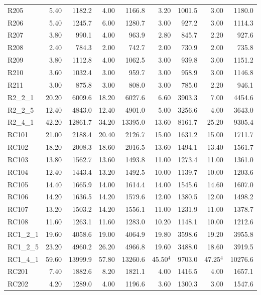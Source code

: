 \documentclass{article}
\begin{document}
{\begin{longtable}{l r r r r r r r r }
R205 & 5.40 & 1182.2 & 4.00 & 1166.8 & 3.20 & 1001.5 & 3.00 & 1180.0 \\
R206 & 5.40 & 1245.7 & 6.00 & 1280.7 & 3.00 & 927.2 & 3.00 & 1114.3 \\
R207 & 3.80 & 990.1 & 4.00 & 963.9 & 2.80 & 845.7 & 2.20 & 927.6 \\
R208 & 2.40 & 784.3 & 2.00 & 742.7 & 2.00 & 730.9 & 2.00 & 735.8 \\
R209 & 3.80 & 1112.8 & 4.00 & 1062.5 & 3.00 & 939.8 & 3.00 & 1151.2 \\
R210 & 3.60 & 1032.4 & 3.00 & 959.7 & 3.00 & 958.9 & 3.00 & 1146.8 \\
R211 & 3.00 & 875.8 & 3.00 & 808.0 & 3.00 & 785.0 & 2.20 & 946.1 \\
R2\_2\_1 & 20.20 & 6009.6 & 18.20 & 6027.6 & 6.60 & 3903.3 & 7.00 & 4454.6 \\
R2\_2\_5 & 12.40 & 4843.0 & 12.40 & 4901.0 & 5.00 & 3256.6 & 4.00 & 3643.0 \\
R2\_4\_1 & 42.20 & 12861.7 & 34.20 & 13395.0 & 13.60 & 8161.7 & 25.20 & 9305.4 \\
RC101 & 21.00 & 2188.4 & 20.40 & 2126.7 & 15.00 & 1631.2 & 15.00 & 1711.7 \\
RC102 & 18.20 & 2008.3 & 18.60 & 2016.5 & 13.60 & 1494.1 & 13.40 & 1561.7 \\
RC103 & 13.80 & 1562.7 & 13.60 & 1493.8 & 11.00 & 1273.4 & 11.00 & 1361.0 \\
RC104 & 12.40 & 1443.4 & 13.20 & 1492.5 & 10.00 & 1139.7 & 10.00 & 1203.6 \\
RC105 & 14.40 & 1665.9 & 14.00 & 1614.4 & 14.00 & 1545.6 & 14.60 & 1607.0 \\
RC106 & 14.20 & 1636.5 & 14.20 & 1579.6 & 12.00 & 1380.5 & 12.00 & 1498.2 \\
RC107 & 13.20 & 1503.2 & 14.20 & 1556.1 & 11.00 & 1231.9 & 11.00 & 1378.7 \\
RC108 & 11.60 & 1263.1 & 11.60 & 1283.0 & 10.20 & 1148.1 & 10.00 & 1212.6 \\
RC1\_2\_1 & 19.60 & 4058.6 & 19.00 & 4064.9 & 19.80 & 3598.6 & 19.20 & 3955.8 \\
RC1\_2\_5 & 23.20 & 4960.2 & 26.20 & 4966.8 & 19.60 & 3488.0 & 18.60 & 3919.5 \\
RC1\_4\_1 & 59.60 & 13999.9 & 57.80 & 13260.6 & 45.50$^{4}$ & 9703.0 & 47.25$^{4}$ & 10276.6 \\
RC201 & 7.40 & 1882.6 & 8.20 & 1821.1 & 4.00 & 1416.5 & 4.00 & 1657.1 \\
RC202 & 4.20 & 1289.0 & 4.00 & 1196.6 & 3.60 & 1300.3 & 3.00 & 1547.6 \\

\end{longtable}}
\end{document}
